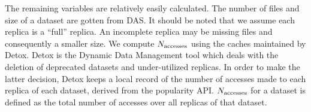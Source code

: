 The remaining variables are relatively easily calculated. The number of files and size of a dataset are gotten from DAS. It should be noted that we assume each replica is a ``full'' replica. An incomplete replica may be missing files and consequently a smaller size. We compute $N_\text{accesses}$ using the caches maintained by Detox. Detox is the Dynamic Data Management tool which deals with the deletion of deprecated datasets and under-utilized replicas. In order to make the latter decision, Detox keeps a local record of the number of accesses made to each replica of each dataset, derived from the popularity API. $N_\text{accesses}$ for a dataset is defined as the total number of accesses over all replicas of that dataset. 